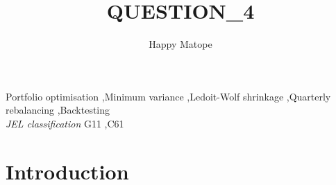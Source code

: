 \documentclass[11pt,preprint]{elsarticle}
\numberwithin{equation}{section}
\numberwithin{figure}{section}
\numberwithin{table}{section}
\begin{document}
\begin{frontmatter}  %

\title{QUESTION\_4}





\author[Add1]{Happy Matope}





\address[Add1]{Stellenbosch University, South Africa}



\vspace{1cm}


\begin{keyword}
\footnotesize{
Portfolio optimisation \sep Minimum variance \sep Ledoit-Wolf shrinkage
\sep Quarterly rebalancing \sep Backtesting \\
\vspace{0.3cm}
}
\footnotesize{
\textit{JEL classification} G11 \sep C61
}
\end{keyword}



\vspace{0.5cm}

\end{frontmatter}

\setcounter{footnote}{0}



\pagestyle{fancy}
\chead{}
\lfoot{}
\lhead{}
\cfoot{}


\headsep 35pt %




\makeatletter
{}
\makeatother

\section{\texorpdfstring{Introduction
\label{Introduction}}{Introduction }}\label{introduction}
\end{document}
